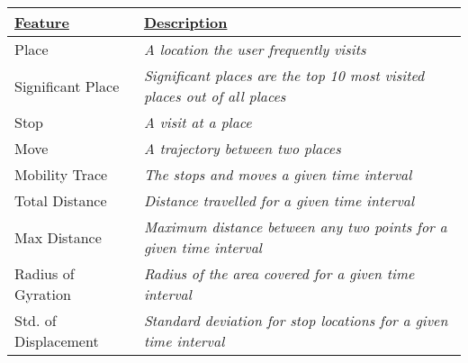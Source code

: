 \begin{table}[h]
    \centering
\begin{tabular}{|p{}|p{}|}
\hline
{\ul \textbf{Feature}}       & {\ul \textbf{Description}}                                                                                                                                        \\ \hline
Place                        & \textit{A location the user frequently visits}                                                                                                                    \\ \hline
Significant Place            & \textit{Significant places are the top 10 most visited places out of all places}                                                                                  \\ \hline
Stop                         & \textit{A visit at a place}                                                                                                                                       \\ \hline
Move                         & \textit{A trajectory between two places}                                                                                                                          \\ \hline
Mobility Trace               & \textit{The stops and moves a given time interval}                                                                                                                \\ \hline
Total Distance               & \textit{Distance travelled for a given time interval}                                                                                                             \\ \hline
Max Distance                 & \textit{Maximum distance between any two points for a given time interval}                                                                                        \\ \hline
Radius of Gyration           & \textit{Radius of the area covered for a given time interval}                                                                                                     \\ \hline
Std. of Displacement         & \textit{Standard deviation for stop locations for a given time interval}                                                                                          \\ \hline

\end{tabular}
\end{table}
